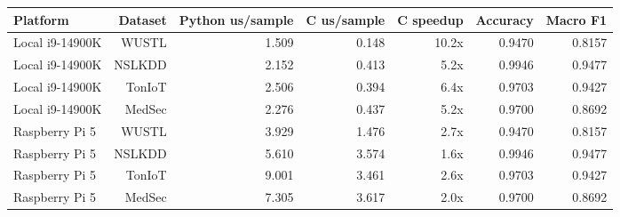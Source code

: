 \begin{tabular}{lrrrrrr}
\toprule
Platform & Dataset & Python us/sample & C us/sample & C speedup & Accuracy & Macro F1 \\
\midrule
Local i9-14900K & WUSTL & 1.509 & 0.148 & 10.2x & 0.9470 & 0.8157 \\
Local i9-14900K & NSLKDD & 2.152 & 0.413 & 5.2x & 0.9946 & 0.9477 \\
Local i9-14900K & TonIoT & 2.506 & 0.394 & 6.4x & 0.9703 & 0.9427 \\
Local i9-14900K & MedSec & 2.276 & 0.437 & 5.2x & 0.9700 & 0.8692 \\
Raspberry Pi 5 & WUSTL & 3.929 & 1.476 & 2.7x & 0.9470 & 0.8157 \\
Raspberry Pi 5 & NSLKDD & 5.610 & 3.574 & 1.6x & 0.9946 & 0.9477 \\
Raspberry Pi 5 & TonIoT & 9.001 & 3.461 & 2.6x & 0.9703 & 0.9427 \\
Raspberry Pi 5 & MedSec & 7.305 & 3.617 & 2.0x & 0.9700 & 0.8692 \\
\bottomrule
\end{tabular}
